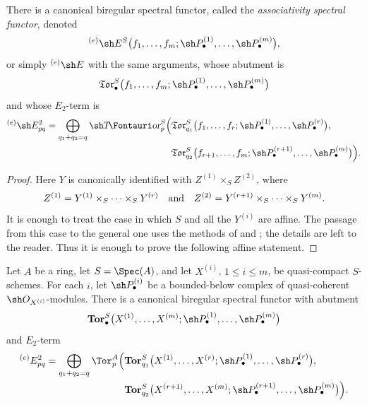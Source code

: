 \begin{proposition}[6.8.2]
\label{III.6.8.2}
There is a canonical biregular spectral functor, called the
\emph{associativity spectral functor}, denoted
\[
  {}^{(e)}\sh E^S
  \bigl(
    f_1,\ldots,f_m;
    \sh P_\bullet^{(1)},\ldots,\sh P_\bullet^{(m)}
  \bigr),
\]
or simply ${}^{(e)}\sh E$ with the same arguments, whose abutment
is
\[
  \mathfrak{Tor}_\bullet^S
  \bigl(
    f_1,\ldots,f_m;
    \sh P_\bullet^{(1)},\ldots,\sh P_\bullet^{(m)}
  \bigr)
\]
and whose $E_2$-term is
\[
\begin{split}
  {}^{(e)}\sh E_{pq}^2
  =
  \bigoplus_{q_1+q_2=q}
  \shTor_p^S
  \Bigl(
    &
    \mathfrak{Tor}_{q_1}^S
    \bigl(
      f_1,\ldots,f_r;
      \sh P_\bullet^{(1)},\ldots,\sh P_\bullet^{(r)}
    \bigr),
    \\
    &
    \mathfrak{Tor}_{q_2}^S
    \bigl(
      f_{r+1},\ldots,f_m;
      \sh P_\bullet^{(r+1)},\ldots,\sh P_\bullet^{(m)}
    \bigr)
  \Bigr).
\end{split}
\]
\end{proposition}

\begin{proof}
Here $Y$ is canonically identified with
$Z^{(1)}\times_SZ^{(2)}$, where
\[
  Z^{(1)}
  =
  Y^{(1)}\times_S\cdots\times_SY^{(r)}
  \quad\hbox{and}\quad
  Z^{(2)}
  =
  Y^{(r+1)}\times_S\cdots\times_SY^{(m)}.
\]
It is enough to treat the case in which $S$ and all the
$Y^{(i)}$ are affine.  The passage from this case to the general
one uses the methods of  and
; the details are left to the reader.  Thus it is
enough to prove the following affine statement.
\end{proof}

\begin{corollary}[6.8.3]
\label{III.6.8.3}
Let $A$ be a ring, let $S=\Spec(A)$, and let $X^{(i)}$,
$1\leq i\leq m$, be quasi-compact $S$-schemes.  For each $i$, let
$\sh P_\bullet^{(i)}$ be a bounded-below complex of
quasi-coherent $\sh O_{X^{(i)}}$-modules.  There is a canonical
biregular spectral functor with abutment
\[
  \mathbf{Tor}_\bullet^S
  \bigl(
    X^{(1)},\ldots,X^{(m)};
    \sh P_\bullet^{(1)},\ldots,\sh P_\bullet^{(m)}
  \bigr)
\]
and $E_2$-term
\[
\begin{split}
  {}^{(e)}E_{pq}^2
  =
  \bigoplus_{q_1+q_2=q}
  \Tor_p^A
  \Bigl(
    &
    \mathbf{Tor}_{q_1}^S
    \bigl(
      X^{(1)},\ldots,X^{(r)};
      \sh P_\bullet^{(1)},\ldots,\sh P_\bullet^{(r)}
    \bigr),
    \\
    &
    \mathbf{Tor}_{q_2}^S
    \bigl(
      X^{(r+1)},\ldots,X^{(m)};
      \sh P_\bullet^{(r+1)},\ldots,\sh P_\bullet^{(m)}
    \bigr)
  \Bigr).
\end{split}
\]
\end{corollary}

